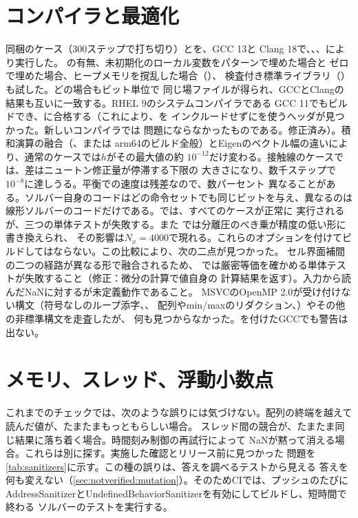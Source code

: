 \section{コンパイラと最適化}
\label{sec:verification:compilers}

同梱のケース（300ステップで打ち切り）とを、GCC 13と
Clang 18で、、、により実行した。
の有無、未初期化のローカル変数をパターンで埋めた場合と
ゼロで埋めた場合、ヒープメモリを撹乱した場合（）、
検査付き標準ライブラリ（）も試した。どの場合もビット単位で
同じ場ファイルが得られ、GCCとClangの結果も互いに一致する。RHEL 9のシステムコンパイラである
GCC 11でもビルドでき、に合格する（これにより、を
インクルードせずにを使うヘッダが見つかった。新しいコンパイラでは
問題にならなかったものである。修正済み）。積和演算の融合（、または
arm64のビルド全般）とEigenのベクトル幅の違いにより、通常のケースでは$h$がその最大値の約
$10^{-12}$だけ変わる。接触線のケースでは、差はニュートン修正量が停滞する下限の
大きさになり、数千ステップで$10^{-8}$に達しうる。平衡での速度は残差なので、数パーセント
異なることがある。ソルバー自身のコードはどの命令セットでも同じビットを与え、異なるのは
線形ソルバーのコードだけである。では、すべてのケースが正常に
実行されるが、三つの単体テストが失敗する。また
では分離圧のべき乗が精度の低い形に書き換えられ、
その影響は$N_x = 4000$で現れる。これらのオプションを付けてビルドしてはならない。この比較により、次の二点が見つかった。
セル界面補間の二つの経路が異なる形で融合されるため、
では厳密等価を確かめる単体テストが失敗すること（修正：微分の計算で値自身の
計算結果を返す）。入力から読んだNaNに対するが未定義動作であること。
MSVCのOpenMP 2.0が受け付けない構文（符号なしのループ添字、、
配列やmin/maxのリダクション、）やその他の非標準構文を走査したが、
何も見つからなかった。を付けたGCCでも警告は出ない。

\section{メモリ、スレッド、浮動小数点}
\label{sec:verification:sanitizers}

これまでのチェックでは、次のような誤りには気づけない。配列の終端を越えて読んだ値が、たまたまもっともらしい場合。
スレッド間の競合が、たまたま同じ結果に落ち着く場合。時間刻み制御の再試行によって
NaNが黙って消える場合。これらは別に探す。実施した確認とリリース前に見つかった
問題を\cref{tab:sanitizers}に示す。この種の誤りは、答えを調べるテストから見える
答えを何も変えない（\cref{sec:notverified:mutation}）。そのためCIでは、プッシュのたびに
AddressSanitizerとUndefinedBehaviorSanitizerを有効にしてビルドし、短時間で終わる
ソルバーのテストを実行する。

